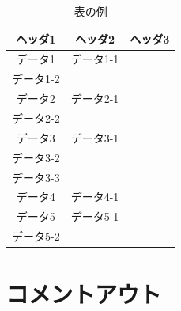 \documentclass[dvipdfmx]{miyalab}
\begin{document}
\begin{table}[htb]
	\caption{表の例}
	\label{tab:table-sample-rowcolor}
	\begin{tabularx}{\linewidth}{|C|C|C|}
		\hline
		\textbf{ヘッダ1} & \textbf{ヘッダ2} & \textbf{ヘッダ3}  \tabularnewline \hline
		データ1          & データ1-1 \\
		                   データ1-2        & \checkmark        \tabularnewline \hline
		データ2          & データ2-1 \\
		                   データ2-2        &                   \tabularnewline \hline
		データ3          & データ3-1 \\
		                   データ3-2 \\
						   データ3-3        &                   \tabularnewline \hline
		データ4          & データ4-1        &  \checkmark       \tabularnewline \hline
		データ5          & データ5-1 \\ 
		                   データ5-2        &  \checkmark       \tabularnewline \hline
	\end{tabularx}
\end{table}


\section{コメントアウト}

\end{document}
